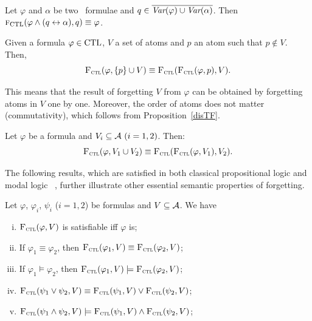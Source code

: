 \documentclass{article}
\begin{document}
\begin{lemma}\label{lem:KF:eq}
	Let $\varphi$ and $\alpha$ be two \CTL\ formulae and $q\in
		\overline{\textit{Var}(\varphi) \cup \textit{Var}(\alpha)}$. Then
	${\textsc{f}_{\textrm{CTL}}}(\varphi \wedge (q\leftrightarrow\alpha), q)\equiv \varphi$.
\end{lemma}


\begin{proposition}\label{disTF}
Given a formula $\varphi \in \textrm{CTL}$, $V$ a set of atoms and $p$ an atom such that $p \notin V$. Then,
\[
{\textsc{F}_{\textsc{ctl}}}(\varphi, \{p\} \cup V) \equiv {\textsc{F}_{\textsc{ctl}}}({\textsc{F}_{\textsc{ctl}}}(\varphi, p), V).
\]
\end{proposition}
This means that the result of forgetting $V$ from $\varphi$ can be obtained by forgetting atoms in $V$ one by one.
Moreover, the order of atoms does not matter (commutativity), which follows from  Proposition~\ref{disTF}.

\begin{corollary}[Commutativity]\label{disTFV}
Let $\varphi$ be a formula and $V_i\subseteq{\cal A}~(i=1,2)$. Then:
\[
{\textsc{F}_{\textsc{ctl}}}(\varphi, V_1 \cup V_2) \equiv {\textsc{F}_{\textsc{ctl}}}({\textsc{F}_{\textsc{ctl}}}(\varphi, V_1), V_2).
\]
\end{corollary}


The following results, which are satisfied in both classical propositional logic and modal logic \SFive~\cite{Yan:AIJ:2009}, further illustrate other essential semantic properties of forgetting.
\begin{proposition}\label{pro:ctl:forget:1}
Let $\varphi$, $\varphi_i$, $\psi_i$ ($i=1,2$) be formulas and $V\subseteq {\cal A}$. We have
\begin{enumerate}[(i)]
  \item ${\textsc{F}_{\textsc{ctl}}}(\varphi, V)$ is satisfiable iff $\varphi$ is;
  \item If $\varphi_1 \equiv \varphi_2$, then ${\textsc{F}_{\textsc{ctl}}}(\varphi_1, V) \equiv {\textsc{F}_{\textsc{ctl}}}(\varphi_2, V)$;
  \item If $\varphi_1 \models \varphi_2$, then ${\textsc{F}_{\textsc{ctl}}}(\varphi_1, V) \models {\textsc{F}_{\textsc{ctl}}}(\varphi_2, V)$;
  \item ${\textsc{F}_{\textsc{ctl}}}(\psi_1 \vee \psi_2, V) \equiv {\textsc{F}_{\textsc{ctl}}}(\psi_1, V) \vee {\textsc{F}_{\textsc{ctl}}}(\psi_2, V)$;
  \item ${\textsc{F}_{\textsc{ctl}}}(\psi_1 \wedge \psi_2, V) \models {\textsc{F}_{\textsc{ctl}}}(\psi_1, V) \wedge {\textsc{F}_{\textsc{ctl}}}(\psi_2, V)$;
\end{enumerate}
\end{proposition}
\end{document}
